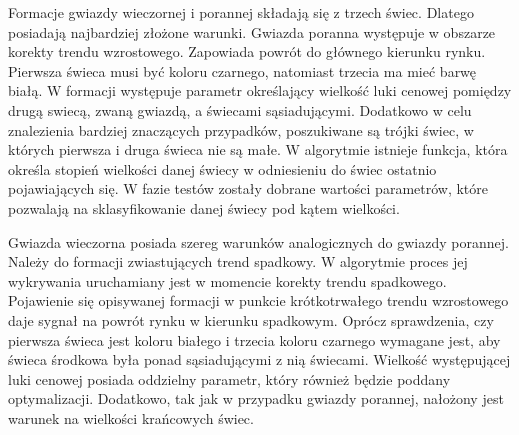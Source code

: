 \documentclass[pdflatex,11pt]{aghdpl}
\begin{document}
Formacje gwiazdy wieczornej i porannej składają się z trzech świec. Dlatego posiadają najbardziej złożone warunki. Gwiazda poranna występuje w obszarze korekty trendu wzrostowego. Zapowiada powrót do głównego kierunku rynku. Pierwsza świeca musi być koloru czarnego, natomiast trzecia ma mieć barwę białą. W formacji występuje parametr określający wielkość luki cenowej pomiędzy drugą swiecą, zwaną gwiazdą, a świecami sąsiadującymi. Dodatkowo w celu znalezienia bardziej znaczących przypadków, poszukiwane są trójki świec, w których pierwsza i druga świeca nie są małe. W algorytmie istnieje funkcja, która określa stopień wielkości danej świecy w odniesieniu do świec ostatnio pojawiających się. W fazie testów zostały dobrane wartości parametrów, które pozwalają na sklasyfikowanie danej świecy pod kątem wielkości.

Gwiazda wieczorna posiada szereg warunków analogicznych do gwiazdy porannej. Należy do formacji zwiastujących trend spadkowy. W algorytmie proces jej wykrywania uruchamiany jest w momencie korekty trendu spadkowego. Pojawienie się opisywanej formacji w punkcie krótkotrwałego trendu wzrostowego daje sygnał na powrót rynku w kierunku spadkowym. Oprócz sprawdzenia, czy pierwsza świeca jest koloru białego i trzecia koloru czarnego wymagane jest, aby świeca środkowa była ponad sąsiadującymi z nią świecami. Wielkość występującej luki cenowej posiada oddzielny parametr, który również będzie poddany optymalizacji. Dodatkowo, tak jak w przypadku gwiazdy porannej, nałożony jest warunek na wielkości krańcowych świec. 
\end{document}
